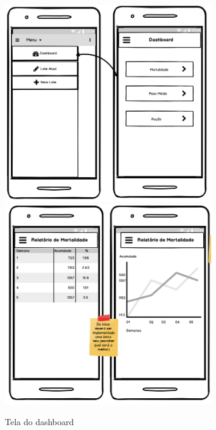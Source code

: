 \begin{anexosenv}
\begin{figure}[htb!]
    \centering
    \caption{Tela do dashboard}
    \includegraphics[width=0.8\textwidth]{./dados/figuras/p6.png}
    \includegraphics[width=0.8\textwidth]{./dados/figuras/p7.png}
    \label{fig:p6}
\end{figure}



\end{anexosenv}
